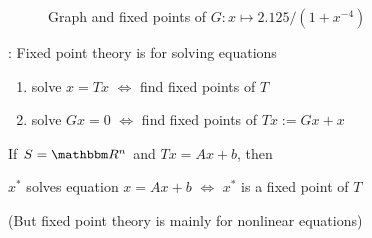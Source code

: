 \begin{frame}
    
    \begin{figure}
        \centering
        \caption{\label{f:three_fixed_points} 
            Graph and fixed points of $G \colon x \mapsto 2.125/(1 + x^{-4})$ }
    \end{figure}

\end{frame}


\begin{frame}

    : Fixed point theory is for solving equations
    \begin{enumerate}
        \item solve $x = Tx$ $\iff$ find fixed points of $T$
        \item solve $Gx = 0$ $\iff$ find fixed points of $Tx := Gx + x$
    \end{enumerate}


    \Eg If $S = \RR^n$ and $T x = Ax + b$, then 
    \begin{center}
        $x^*$ solves equation  $x = Ax + b$
        $\iff$ 
        $x^*$ is a fixed point of $T$ 
    \end{center}


    (But fixed point theory is mainly for nonlinear equations)

    
\end{frame}


